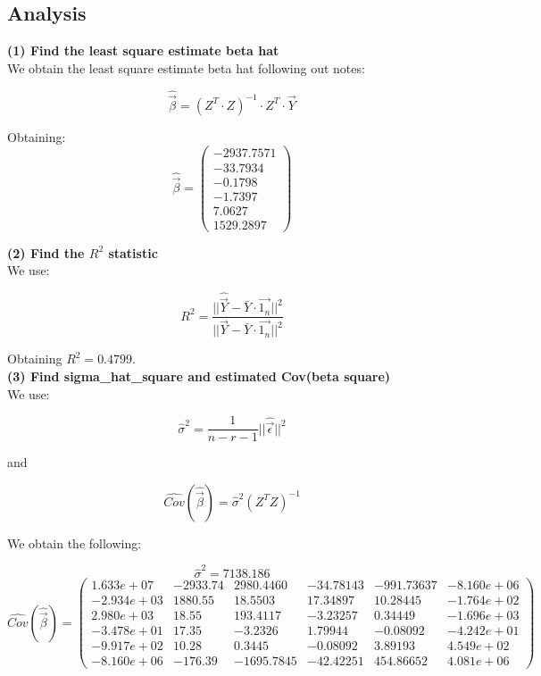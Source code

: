 \documentclass[11pt,a4paper]{article}
\begin{document}
	\subsection{Analysis}
	
	\textbf{(1) Find the least square estimate beta hat} \\
	
	We obtain the least square estimate beta hat following out notes:
	
	$$ \hat{\vec{\beta}} = (Z^T \cdot Z)^{-1} \cdot Z^T \cdot \vec{Y} $$
	
	Obtaining:
	$$ \hat{\vec{\beta}} =
		\begin{pmatrix}
		-2937.7571 \\
		-33.7934   \\
		-0.1798   \\
		-1.7397    \\
		7.0627     \\
		1529.2897
		\end{pmatrix}
	$$
	
	\textbf{(2) Find the $R^2$ statistic} \\
	
	We use:
	
	$$ R^2 = \frac{||\hat{\vec{Y}} - \bar{Y} \cdot \vec{1_n}||^2}{||\vec{Y} - \bar{Y} \cdot \vec{1_n}||^2} $$
	
	Obtaining $R^2 = 0.4799$. \\
	
	\textbf{(3) Find sigma\_hat\_square and estimated Cov(beta square)} \\
	
	We use:
	
	$$ \hat{\sigma}^2 = \frac{1}{n-r-1} ||\hat{\vec{\epsilon}}||^2 $$
	
	and
	
	$$ \hat{Cov}(\hat{\vec{\beta}}) = \hat{\sigma}^2 (Z^T Z)^{-1} $$
	
	We obtain the following:
	
	$$ \hat{\sigma}^2 = 7138.186 $$	
	$$ \hat{Cov}(\hat{\vec{\beta}}) = 
	\begin{pmatrix}
	1.633e+07  & -2933.74 & 2980.4460  & -34.78143 & -991.73637 & -8.160e+06 \\
	-2.934e+03 & 1880.55  & 18.5503    & 17.34897  & 10.28445   & -1.764e+02 \\
	2.980e+03  & 18.55    & 193.4117   & -3.23257  & 0.34449    & -1.696e+03 \\
	-3.478e+01 & 17.35    & -3.2326    & 1.79944   & -0.08092   & -4.242e+01 \\
	-9.917e+02 & 10.28    & 0.3445     & -0.08092  & 3.89193    & 4.549e+02  \\
	-8.160e+06 & -176.39  & -1695.7845 & -42.42251 & 454.86652  & 4.081e+06 
	\end{pmatrix}
	$$ \\
	
\end{document}
